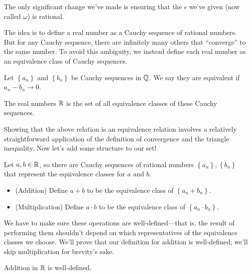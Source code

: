 \documentclass[../m131main.tex]{subfiles}
\begin{document}
The only significant change we've made is ensuring that the $\epsilon$ we've given (now called $\omega$) is rational.

The idea is to define a real number as a Cauchy sequence of rational numbers.
But for any Cauchy sequence, there are infinitely many others that ``converge'' to the same number.
To avoid this ambiguity, we instead define each real number as an equivalence class of Cauchy sequences.

\begin{definition}
    Let $\left\{ a_n \right\}$ and $\left\{ b_n \right\}$ be Cauchy sequences in $\mathbb{Q}$.
    We say they are equivalent if $a_n - b_n \to 0$.

    The real numbers $\mathbb{R}$ is the set of all equivalence classes of these Cauchy sequences.
\end{definition}

Showing that the above relation is an equivalence relation involves a relatively straightforward application of the definition of convergence and the triangle inequality.
Now let's add some structure to our set!

\pagebreak

\begin{definition}
    Let $a,b \in \mathbb{R}$, so there are Cauchy sequences of rational numbers $\left\{ a_n \right\}, \left\{ b_n \right\}$ that represent the equivalence classes for $a$ and $b$.
    \begin{itemize}
        \item (Addition)
        Define $a+b$ to be the equivalence class of $\left\{ a_n + b_n \right\}$.
        \item (Multiplication)
        Define $a \cdot b$ to be the equivalence class of $\left\{ a_n \cdot b_n \right\}$.
    \end{itemize}
\end{definition}

We have to make sure these operations are well-defined---that is, the result of performing them shouldn't depend on which representatives of the equivalence classes we choose.
We'll prove that our definition for addition is well-defined; we'll skip multiplication for brevity's sake.

\begin{theorem}
    Addition in $\mathbb{R}$ is well-defined.
\end{theorem}
\end{document}
